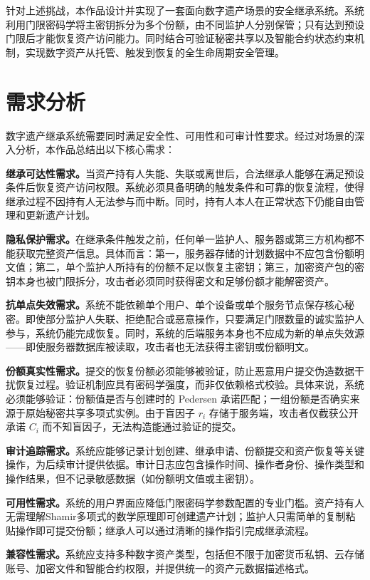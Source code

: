 \documentclass[UTF8,a4paper,zihao=-4,openany]{ctexrep}
\begin{document}
针对上述挑战，本作品设计并实现了一套面向数字遗产场景的安全继承系统。系统利用门限密码学将主密钥拆分为多个份额，由不同监护人分别保管；只有达到预设门限后才能恢复资产访问能力。同时结合可验证秘密共享以及智能合约状态约束机制，实现数字资产从托管、触发到恢复的全生命周期安全管理。

\section{需求分析}

数字遗产继承系统需要同时满足安全性、可用性和可审计性要求。经过对场景的深入分析，本作品总结出以下核心需求：

\textbf{继承可达性需求。}当资产持有人失能、失联或离世后，合法继承人能够在满足预设条件后恢复资产访问权限。系统必须具备明确的触发条件和可靠的恢复流程，使得继承过程不因持有人无法参与而中断。同时，持有人本人在正常状态下仍能自由管理和更新遗产计划。

\textbf{隐私保护需求。}在继承条件触发之前，任何单一监护人、服务器或第三方机构都不能获取完整资产信息。具体而言：第一，服务器存储的计划数据中不应包含份额明文值；第二，单个监护人所持有的份额不足以恢复主密钥；第三，加密资产包的密钥本身也被门限拆分，攻击者必须同时获得密文和足够份额才能解密资产。

\textbf{抗单点失效需求。}系统不能依赖单个用户、单个设备或单个服务节点保存核心秘密。即使部分监护人失联、拒绝配合或恶意操作，只要满足门限数量的诚实监护人参与，系统仍能完成恢复。同时，系统的后端服务本身也不应成为新的单点失效源——即使服务器数据库被读取，攻击者也无法获得主密钥或份额明文。

\textbf{份额真实性需求。}提交的恢复份额必须能够被验证，防止恶意用户提交伪造数据干扰恢复过程。验证机制应具有密码学强度，而非仅依赖格式校验。具体来说，系统必须能够验证：份额值是否与创建时的 Pedersen 承诺匹配；一组份额是否确实来源于原始秘密共享多项式实例。由于盲因子 $r_i$ 存储于服务端，攻击者仅截获公开承诺 $C_i$ 而不知盲因子，无法构造能通过验证的提交。

\textbf{审计追踪需求。}系统应能够记录计划创建、继承申请、份额提交和资产恢复等关键操作，为后续审计提供依据。审计日志应包含操作时间、操作者身份、操作类型和操作结果，但不记录敏感数据（如份额明文值或主密钥）。

\textbf{可用性需求。}系统的用户界面应降低门限密码学参数配置的专业门槛。资产持有人无需理解Shamir多项式的数学原理即可创建遗产计划；监护人只需简单的复制粘贴操作即可提交份额；继承人可以通过清晰的操作指引完成继承流程。

\textbf{兼容性需求。}系统应支持多种数字资产类型，包括但不限于加密货币私钥、云存储账号、加密文件和智能合约权限，并提供统一的资产元数据描述格式。
\end{document}

